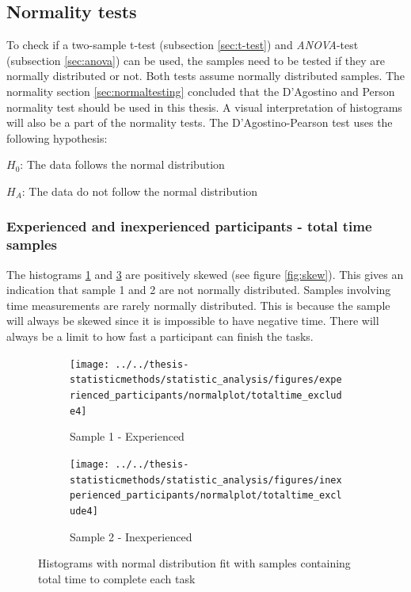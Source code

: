 \subsection{Normality tests}\label{sec:normality_results}
To check if a two-sample t-test (subsection \ref{sec:t-test}) and \textit{ANOVA}-test (subsection \ref{sec:anova}) can be used, the samples need to be tested if they are normally distributed or not. Both tests assume normally distributed samples. The normality section \ref{sec:normaltesting} concluded that the D'Agostino and Person normality test should be used in this thesis. A visual interpretation of histograms will also be a part of the normality tests. The D'Agostino-Pearson test uses the following hypothesis:\newline

\centerline{$H_{0}$: The data follows the normal distribution} 
\centerline{$H_{A}$: The data do not follow the normal distribution}


\subsubsection[Sample 1 and 2]{Experienced and inexperienced participants - total time samples}\label{sec:totaltime_ex_inex}
The histograms \ref{fig:totaltimeexclude4_experienced} and \ref{fig:totaltimeexclude4_inexperienced} are positively skewed (see figure \ref{fig:skew}). This gives an indication that sample 1 and 2 are not normally distributed. Samples involving time measurements are rarely normally distributed. This is because the sample will always be skewed since it is impossible to have negative time. There will always be a limit to how fast a participant can finish the tasks. 

\begin{figure}[H]
	\centering
	\begin{subfigure}[b]{0.48\textwidth}
		\centering
		\texttt{[image: ../../thesis-statisticmethods/statistic\_analysis/figures/experienced\_participants/normalplot/totaltime\_exclude4]}
		\caption{Sample 1 - Experienced}
		\label{fig:totaltimeexclude4_experienced}
	\end{subfigure}
	\begin{subfigure}[b]{0.48\textwidth}
		\centering
		\texttt{[image: ../../thesis-statisticmethods/statistic\_analysis/figures/inexperienced\_participants/normalplot/totaltime\_exclude4]}
		\caption{Sample 2 - Inexperienced}
		\label{fig:totaltimeexclude4_inexperienced}
	\end{subfigure}
\caption{Histograms with normal distribution fit with samples containing total time to complete each task}
\end{figure}


